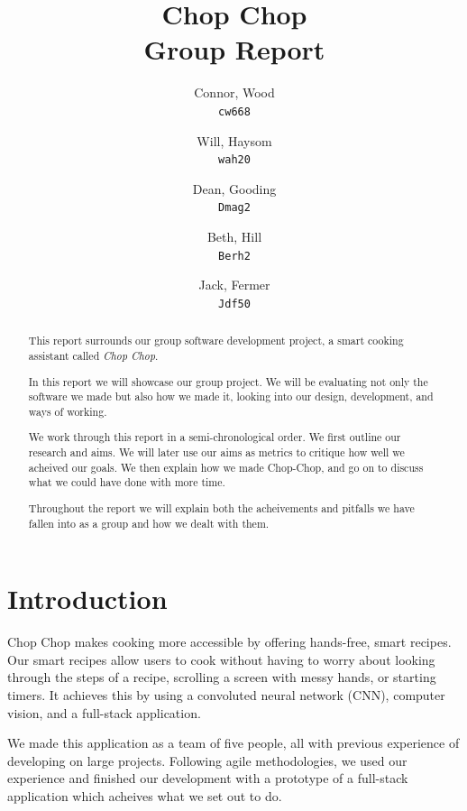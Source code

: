 \documentclass{article}
\title{%
Chop Chop \\
  \large Group Report}
\author{
  Connor, Wood\\
  \texttt{cw668}
  \and
  Will, Haysom\\
  \texttt{wah20}
  \and
  Dean, Gooding\\
  \texttt{Dmag2}
  \and
  Beth, Hill\\
  \texttt{Berh2}
  \and
  Jack, Fermer\\
  \texttt{Jdf50}
}
\begin{document}
\maketitle

\pagebreak

\linenumbers

\begin{abstract}
      This report surrounds our group software development project, a smart cooking assistant called \emph{Chop Chop}. 
    
      In this report we will showcase our group project. We will be evaluating not only the software we made but also how we made it, looking into our design, development, and ways of working.

      We work through this report in a semi-chronological order. We first outline our research and aims. We will later use our aims as metrics to critique how well we acheived our goals. We then explain how we made Chop-Chop, and go on to discuss what we could have done with more time.

      Throughout the report we will explain both the acheivements and pitfalls we have fallen into as a group and how we dealt with them.
  \end{abstract}

  \pagebreak

  \tableofcontents

  \pagebreak



    \section{Introduction}
Chop Chop makes cooking more accessible by offering hands-free, smart recipes. Our smart recipes allow users to cook without having to worry about looking through the steps of a recipe, scrolling a screen with messy hands, or starting timers. It achieves this by using a convoluted neural network (CNN), computer vision, and a full-stack application.

We made this application as a team of five people, all with previous experience of developing on large projects. Following agile methodologies, we used our experience and finished our development with a prototype of a full-stack application which acheives what we set out to do. 
\end{document}
